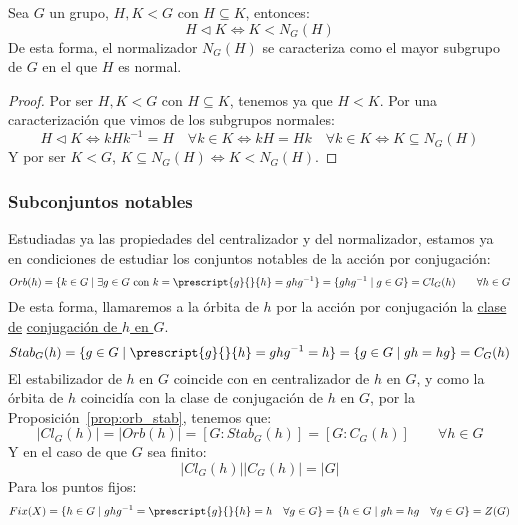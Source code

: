 \begin{prop} %
    Sea $G$ un grupo, $H,K< G$ con $H\subseteq K$, entonces:
    \begin{equation*}
        H \lhd K \Longleftrightarrow K < N_G(H)
    \end{equation*}
    De esta forma, el normalizador $N_G(H)$ se caracteriza como el mayor subgrupo de $G$ en el que $H$ es normal.
    \begin{proof}
        Por ser $H,K<G$ con $H\subseteq K$, tenemos ya que $H<K$. Por una caracterización que vimos de los subgrupos normales:
        \begin{equation*}
            H\lhd K \Longleftrightarrow kHk^{-1} = H \quad \forall k\in K \Longleftrightarrow kH = Hk \quad \forall k\in K \Longleftrightarrow K \subseteq N_G(H) 
        \end{equation*}
        Y por ser $K<G$, $K\subseteq N_G(H) \Longleftrightarrow K<N_G(H)$.
    \end{proof}
\end{prop}

\subsubsection{Subconjuntos notables}
\noindent
Estudiadas ya las propiedades del centralizador y del normalizador, estamos ya en condiciones de estudiar los conjuntos notables de la acción por conjugación:
\begin{equation*}
    Orb(h) = \{k\in G \mid \exists g\in G \text{\ con\ } k = \prescript{g}{}{h} = ghg^{-1}\} = \{ghg^{-1}\mid g\in G\} = Cl_G(h) \qquad \forall h\in G
\end{equation*}
De esta forma, llamaremos a la órbita de $h$ por la acción por conjugación la \underline{clase de} \underline{conjugación de $h$ en $G$}.
\begin{equation*}
    Stab_G(h) = \{g\in G \mid \prescript{g}{}{h} = ghg^{-1} = h\} = \{g \in G \mid gh = hg\} = C_G(h)
\end{equation*}
El estabilizador de $h$ en $G$ coincide con en centralizador de $h$ en $G$, y como la órbita de $h$ coincidía con la clase de conjugación de $h$ en $G$, por la Proposición~\ref{prop:orb_stab}, tenemos que:
\begin{equation*}
    |Cl_G(h)| = |Orb(h)| = [G:Stab_G(h)] = [G:C_G(h)] \qquad \forall h\in G
\end{equation*}
Y en el caso de que $G$ sea finito:
\begin{equation*}
    |Cl_G(h)| |C_G(h)| = |G|
\end{equation*}
Para los puntos fijos:
\begin{equation*}
    Fix(X) = \{h\in G \mid ghg^{-1} = \prescript{g}{}{h} = h \quad \forall g\in G\} = \{h\in G\mid gh = hg \quad \forall g\in G\} = Z(G)
\end{equation*}

